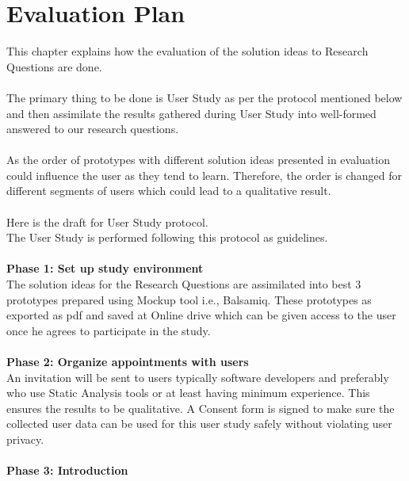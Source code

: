 \chapter{Evaluation Plan}
\label{ch:evaluationplan} 

This chapter explains how the evaluation of the solution ideas to Research Questions are done. \\ \\

The primary thing to be done is User Study as per the protocol mentioned below and then assimilate the results gathered during User Study into well-formed answered to our research questions. \\ \\

As the order of prototypes with different solution ideas presented in evaluation could influence the user as they tend to learn. Therefore, the order is changed for different segments of users which could lead to a qualitative result. \\ \\

Here is the draft for User Study protocol. \\

The User Study is performed following this protocol as guidelines. \\ \\

\textbf{Phase 1: Set up study environment} \\

The solution ideas for the Research Questions are assimilated into best 3 prototypes prepared using Mockup tool i.e., Balsamiq. These prototypes as exported as pdf and saved at Online drive which can be given access to the user once he agrees to participate in the study. \\\\

\textbf{Phase 2: Organize appointments with users} \\

An invitation will be sent to users typically software developers and preferably who use Static Analysis tools or at least having minimum experience. This ensures the results to be qualitative.
A Consent form is signed to make sure the collected user data can be used for this user study safely without violating user privacy. \\\\

\textbf{Phase 3: Introduction} \\

